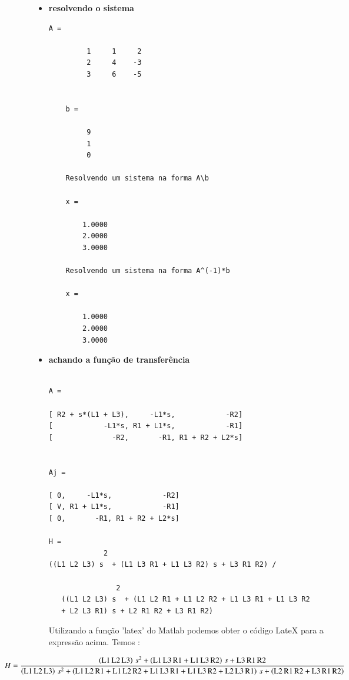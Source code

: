 \documentclass[a4paper,11pt]{article}
\begin{document}
\begin{itemize}
  \item \textbf{resolvendo o sistema}
  \begin{lstlisting}[frame=single]
    A =

         1     1     2
         2     4    -3
         3     6    -5


    b =

         9
         1
         0

    Resolvendo um sistema na forma A\b

    x =

        1.0000
        2.0000
        3.0000

    Resolvendo um sistema na forma A^(-1)*b

    x =

        1.0000
        2.0000
        3.0000
      \end{lstlisting}

\item \textbf{achando a função de transferência}
\begin{lstlisting}[frame=single]
   
A =
 
[ R2 + s*(L1 + L3),     -L1*s,            -R2]
[            -L1*s, R1 + L1*s,            -R1]
[              -R2,       -R1, R1 + R2 + L2*s]
 
 
Aj =
 
[ 0,     -L1*s,            -R2]
[ V, R1 + L1*s,            -R1]
[ 0,       -R1, R1 + R2 + L2*s]
 
H = 
             2
((L1 L2 L3) s  + (L1 L3 R1 + L1 L3 R2) s + L3 R1 R2) /

                2
   ((L1 L2 L3) s  + (L1 L2 R1 + L1 L2 R2 + L1 L3 R1 + L1 L3 R2 
   + L2 L3 R1) s + L2 R1 R2 + L3 R1 R2)

\end{lstlisting}

Utilizando a função 'latex' do Matlab podemos obter o código LateX para a 
expressão acima. Temos : 

\begin{displaymath}
\hspace{-2 cm}  H = \frac{\left(\mathrm{L1}\, \mathrm{L2}\, \mathrm{L3}\right)\, s^2 + \left(\mathrm{L1}\, \mathrm{L3}\, \mathrm{R1} + \mathrm{L1}\, \mathrm{L3}\, \mathrm{R2}\right)\, s + \mathrm{L3}\, \mathrm{R1}\, \mathrm{R2}}{\left(\mathrm{L1}\, \mathrm{L2}\, \mathrm{L3}\right)\, s^2 + \left(\mathrm{L1}\, \mathrm{L2}\, \mathrm{R1} + \mathrm{L1}\, \mathrm{L2}\, \mathrm{R2} + \mathrm{L1}\, \mathrm{L3}\, \mathrm{R1} + \mathrm{L1}\, \mathrm{L3}\, \mathrm{R2} + \mathrm{L2}\, \mathrm{L3}\, \mathrm{R1}\right)\, s + \left(\mathrm{L2}\, \mathrm{R1}\, \mathrm{R2} + \mathrm{L3}\, \mathrm{R1}\, \mathrm{R2}\right)}
\end{displaymath}


\end{itemize}
\end{document}
